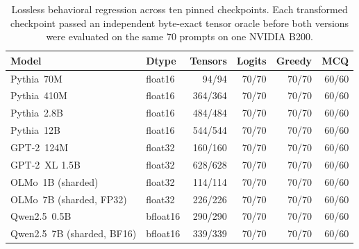 \begin{table}[t]
\centering
\small
\begin{tabular}{llrrrr}
\toprule
Model & Dtype & Tensors & Logits & Greedy & MCQ \\
\midrule
Pythia~70M & float16 & 94/94 & 70/70 & 70/70 & 60/60 \\
Pythia~410M & float16 & 364/364 & 70/70 & 70/70 & 60/60 \\
Pythia~2.8B & float16 & 484/484 & 70/70 & 70/70 & 60/60 \\
Pythia~12B & float16 & 544/544 & 70/70 & 70/70 & 60/60 \\
GPT-2~124M & float32 & 160/160 & 70/70 & 70/70 & 60/60 \\
GPT-2~XL 1.5B & float32 & 628/628 & 70/70 & 70/70 & 60/60 \\
OLMo~1B (sharded) & float32 & 114/114 & 70/70 & 70/70 & 60/60 \\
OLMo~7B (sharded, FP32) & float32 & 226/226 & 70/70 & 70/70 & 60/60 \\
Qwen2.5~0.5B & bfloat16 & 290/290 & 70/70 & 70/70 & 60/60 \\
Qwen2.5~7B (sharded, BF16) & bfloat16 & 339/339 & 70/70 & 70/70 & 60/60 \\
\bottomrule
\end{tabular}
\caption{Lossless behavioral regression across ten pinned checkpoints. Each transformed checkpoint passed an independent byte-exact tensor oracle before both versions were evaluated on the same 70 prompts on one NVIDIA B200.}
\label{tab:behavioral-matrix}
\end{table}
